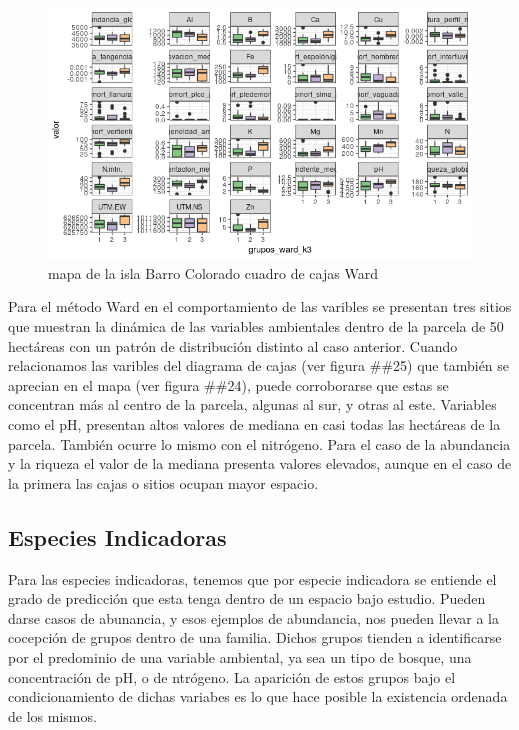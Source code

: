 \documentclass[11pt,]{article}
\begin{document}
\begin{figure}
\centering
\includegraphics[width=1.00000\textwidth]{cuadro_cajas_ward.png}
\caption{mapa de la isla Barro Colorado cuadro de cajas Ward
\label{fig:bci_map}}
\end{figure}

Para el método Ward en el comportamiento de las varibles se presentan
tres sitios que muestran la dinámica de las variables ambientales dentro
de la parcela de 50 hectáreas con un patrón de distribución distinto al
caso anterior. Cuando relacionamos las varibles del diagrama de cajas
(ver figura \#\#25) que también se aprecian en el mapa (ver figura
\#\#24), puede corroborarse que estas se concentran más al centro de la
parcela, algunas al sur, y otras al este. Variables como el pH,
presentan altos valores de mediana en casi todas las hectáreas de la
parcela. También ocurre lo mismo con el nitrógeno. Para el caso de la
abundancia y la riqueza el valor de la mediana presenta valores
elevados, aunque en el caso de la primera las cajas o sitios ocupan
mayor espacio.

\subsection{Especies Indicadoras}\label{especies-indicadoras}

Para las especies indicadoras, tenemos que por especie indicadora se
entiende el grado de predicción que esta tenga dentro de un espacio bajo
estudio. Pueden darse casos de abunancia, y esos ejemplos de abundancia,
nos pueden llevar a la cocepción de grupos dentro de una familia. Dichos
grupos tienden a identificarse por el predominio de una variable
ambiental, ya sea un tipo de bosque, una concentración de pH, o de
ntrógeno. La aparición de estos grupos bajo el condicionamiento de
dichas variabes es lo que hace posible la existencia ordenada de los
mismos.
\end{document}
